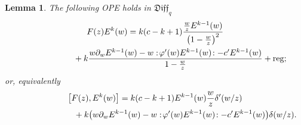 \documentclass[pdftex]{sigma}
\numberwithin{equation}{section}
\newtheorem{Lemma}[Theorem]{Lemma}
\theoremstyle{definition}
\newcommand{\qD}{\mathfrak{Diff}_q}
\begin{document}
\begin{Lemma} The following OPE holds in $\qD$
\begin{gather}
F(z) E^k(w) = k(c-k+1)\frac{\frac{w}{z} E^{k-1}(w)}{\big(1-\frac{w}{z}\big)^2} \nonumber\\
\hphantom{F(z) E^k(w) =}{} + k \frac{w\partial_w E^{k-1}(w) - w:\!\varphi'(w) E^{k-1}(w)\!: - c'E^{k-1}(w)}{1-\frac{w}{z}} + \mathrm{reg}; \label{eq:OPEFE^k}
\end{gather}
or, equivalently
\begin{gather}
\big[F(z), E^k(w)\big] = k(c-k+1) E^{k-1}(w) \frac{w}{z} \delta'(w/z) \nonumber\\
\hphantom{\big[F(z), E^k(w)\big] =}{} +k \big( w \partial_w E^{k-1}(w) - w:\!\varphi'(w) E^{k-1}(w)\!:-c'E^{k-1}(w) \big) \delta(w/z).\label{eq:commutatorFE^k}
\end{gather}
\end{Lemma}
\end{document}
